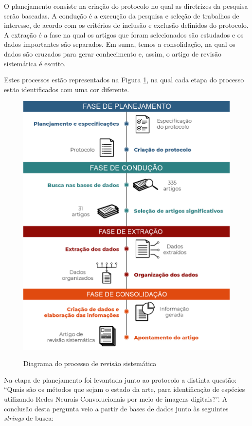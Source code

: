 \documentclass[
	12pt,				%
	oneside,			%
	a4paper,			%
	english,			%
	brazil				%
	]{abntex2ppgsi}
\begin{document}
O planejamento consiste na criação do protocolo no qual as diretrizes da pesquisa serão baseadas. A condução é a execução da pesquisa e seleção de trabalhos de interesse, de acordo com os critérios de inclusão e exclusão definidos do protocolo. A extração é a fase na qual os artigos que foram selecionados são estudados e os dados importantes são separados. Em suma, temos a consolidação, na qual os dados são cruzados para gerar conhecimento e, assim, o artigo de revisão sistemática é escrito.

Estes processos estão representados na Figura \ref{fig:processo_revisao_sistematica}, na qual cada etapa do processo estão identificados com uma cor diferente.

\begin{figure}[H]
    \centering
    \caption{Diagrama do processo de revisão sistemática}
    \includegraphics[scale=.35]{imagens/revisao_sistematica/processo_revisao_sistematica.jpg}
    \label{fig:processo_revisao_sistematica}
\end{figure}

Na etapa de planejamento foi levantada junto ao protocolo a distinta questão:
``Quais são os métodos que sejam o estado da arte, para identificação de espécies utilizando Redes Neurais Convolucionais por meio de imagens digitais?''.
A conclusão desta pergunta veio a partir de bases de dados junto às seguintes \textit{strings} de busca:
\end{document}
